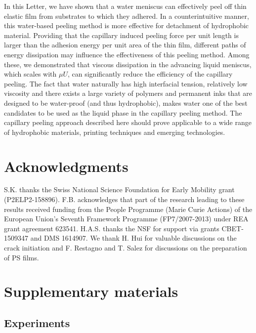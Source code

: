 \documentclass[10pt,twocolumn]{article}
\begin{document}
In this Letter, we have shown that a water meniscus can effectively peel off thin elastic film from substrates to which they adhered.
In a counterintuitive manner, this water-based peeling method is more effective for detachment of hydrophobic material.
Providing that the capillary induced peeling force per unit length is larger than the adhesion energy per unit area of the thin film, different paths of energy dissipation may influence the effectiveness of this peeling method.
Among these, we demonstrated that viscous dissipation in the advancing liquid meniscus, which scales with $\mu U$, can significantly reduce the efficiency of the capillary peeling.
The fact that water naturally has high interfacial tension, relatively low viscosity and there exists a large variety of polymers and permanent inks that are designed to be water-proof (and thus hydrophobic), makes water one of the best candidates to be used as the liquid phase in the capillary peeling method.
The capillary peeling approach described here should prove applicable to a wide range of hydrophobic materials, printing techniques and emerging technologies.

\section*{Acknowledgments}
S.K. thanks the Swiss National Science Foundation for Early Mobility grant (P2ELP2-158896).
F.B. acknowledges that part of the research leading to these results received funding from the People Programme (Marie Curie Actions) of the European Union's Seventh Framework Programme (FP7/2007-2013) under REA grant agreement 623541.
H.A.S. thanks the NSF for support via grants CBET-1509347 and DMS 1614907.
We thank H. Hui for valuable discussions on the crack initiation and F. Restagno and T. Salez for discussions on the preparation of PS films.






        

        


\newpage
\clearpage

\section{Supplementary materials}

\subsection{Experiments}
\end{document}
